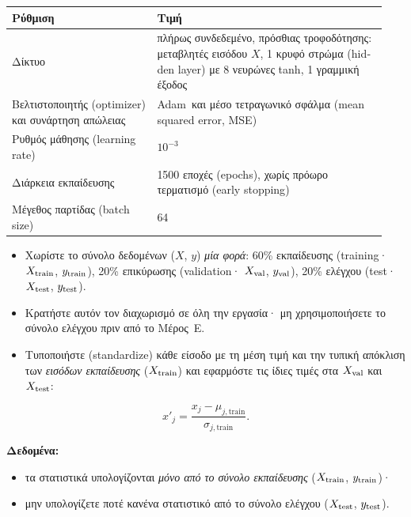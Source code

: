 \documentclass[11pt]{article}
\newcommand{\datause}[1]{\par\smallskip\needspace{4\baselineskip}\noindent\textbf{Δεδομένα:}\nopagebreak\begin{itemize}#1\end{itemize}}
\newcommand{\MSE}{\textlatin{MSE}}
\newcommand{\Adam}{\textlatin{Adam}}
\begin{document}
\begin{center}
\begin{tabular}{@{}p{0.36\linewidth}p{0.58\linewidth}@{}}
\toprule
Ρύθμιση & Τιμή \\
\midrule
Δίκτυο & πλήρως συνδεδεμένο, πρόσθιας τροφοδότησης: μεταβλητές εισόδου $X$, 1 κρυφό στρώμα (\textlatin{hidden layer}) με 8 νευρώνες \textlatin{tanh}, 1 γραμμική έξοδος \\
Βελτιστοποιητής (\textlatin{optimizer}) και συνάρτηση απώλειας & \Adam\ και μέσο τετραγωνικό σφάλμα (\textlatin{mean squared error}, \MSE) \\
Ρυθμός μάθησης (\textlatin{learning rate}) & $10^{-3}$ \\
Διάρκεια εκπαίδευσης & 1500 εποχές (\textlatin{epochs}), χωρίς πρόωρο τερματισμό (\textlatin{early stopping}) \\
Μέγεθος παρτίδας (\textlatin{batch size}) & 64 \\
\bottomrule
\end{tabular}
\end{center}

\begin{itemize}
  \item Χωρίστε το σύνολο δεδομένων ($X$, $y$) \emph{μία φορά}: 60\% εκπαίδευσης (\textlatin{training}· $X_{\rm train}$, $y_{\rm train}$), 20\% επικύρωσης (\textlatin{validation}· $X_{\rm val}$, $y_{\rm val}$), 20\% ελέγχου (\textlatin{test}· $X_{\rm test}$, $y_{\rm test}$).
  \item Κρατήστε αυτόν τον διαχωρισμό σε όλη την εργασία· μη χρησιμοποιήσετε το σύνολο ελέγχου πριν από το Μέρος~Ε.
  \item Τυποποιήστε (\textlatin{standardize}) κάθε είσοδο με τη μέση τιμή και την τυπική απόκλιση των \emph{εισόδων εκπαίδευσης} ($X_{\rm train}$) και εφαρμόστε τις ίδιες τιμές στα $X_{\rm val}$ και $X_{\rm test}$:
\end{itemize}
\[
  x'_j=\frac{x_j-\mu_{j,\mathrm{train}}}{\sigma_{j,\mathrm{train}}}.
\]
\datause{
  \item τα στατιστικά υπολογίζονται \emph{μόνο από το σύνολο εκπαίδευσης} ($X_{\rm train}$, $y_{\rm train}$)·
  \item μην υπολογίζετε ποτέ κανένα στατιστικό από το σύνολο ελέγχου ($X_{\rm test}$, $y_{\rm test}$).}
\begin{center}
\end{center}
\end{document}
